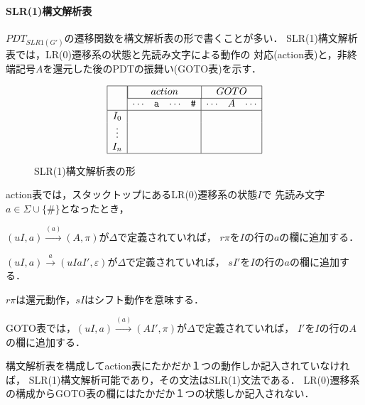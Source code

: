 \documentclass[a4j,dvipdfmx]{jbook}
\begin{document}
\paragraph{SLR(1)構文解析表}
$PDT_{SLR1(G')}$の遷移関数を構文解析表の形で書くことが多い．
SLR(1)構文解析表では，LR(0)遷移系の状態と先読み文字による動作の
対応(action表)と，非終端記号$A$を還元した後のPDTの振舞い(GOTO表)を示す．

\begin{figure}[H]
  \[
    \begin{array}{|c|cccc|ccc|}\hline
             & \multicolumn{4}{|c}{action} & \multicolumn{3}{|c|}{GOTO}                                              \\\cline{2-8}
             & \cdots                      & \texttt{a}                 & \cdots & \texttt{\#} & \cdots & A & \cdots \\\hline
      I_0    &                             &                            &        &             &        &   &        \\
      \vdots &                             &                            &        &             &        &   &        \\
      I_n    &                             &                            &        &             &        &   &        \\\hline
    \end{array}
  \]
  \caption{SLR(1)構文解析表の形}\label{SLR1ParseTable}
\end{figure}

action表では，スタックトップにあるLR(0)遷移系の状態$I$で
先読み文字$a\in\Sigma\cup\{\texttt{\#}\}$となったとき，
\begin{list}{}{}
  \item $(uI,a)\xrightarrow{(a)}(A,\pi)$が$\Delta$で定義されていれば，
        $r\pi$を$I$の行の$a$の欄に追加する．
  \item $(uI,a)\xrightarrow{a}(uIaI',\varepsilon)$が$\Delta$で定義されていれば，
        $sI'$を$I$の行の$a$の欄に追加する．
\end{list}

$r\pi$は還元動作，$sI$はシフト動作を意味する．

GOTO表では，$(uI,a)\xrightarrow{(a)}(AI',\pi)$が$\Delta$で定義されていれば，
$I'$を$I$の行の$A$の欄に追加する．

構文解析表を構成してaction表にたかだか１つの動作しか記入されていなければ，
SLR(1)構文解析可能であり，その文法はSLR(1)文法である．
LR(0)遷移系の構成からGOTO表の欄にはたかだか１つの状態しか記入されない．
\end{document}
